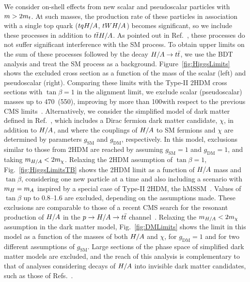 We consider on-shell effects from new scalar and pseudoscalar particles with $m > 2m_t$. At such masses, the production rate of these particles
in association with a single top quark ($tqH/A$, $tWH/A$) becomes significant,
so we include these processes in addition to $t\overline{t}H/A$.
As pointed out in Ref.~\cite{THEORY:Craig2016ygr}, these processes do not suffer significant interference with the SM \tttt process.
To obtain upper limits on the sum of these processes followed by the decay $H/A\to t\bar{t}$,
we use the BDT analysis and treat the SM \tttt process as a background.
Figure~\ref{fig:HiggsLimits} shows the excluded cross section as a function of the mass of the scalar (left) and pseudoscalar (right).
Comparing these limits with the Type-II 2HDM cross sections with $\tan\beta = 1$ in the alignment limit,
we exclude scalar (pseudoscalar) masses up to 470~(550)\GeV, improving by more than 100\GeV with respect to the previous CMS limits~\cite{CMS:mySUS2016}.
Alternatively, we consider the simplified model of dark matter defined in Ref.~\cite{CMS:DMsingletop},
which includes a Dirac fermion dark matter candidate, $\chi$, in addition to $H/A$, and where the couplings of $H/A$
to SM fermions and $\chi$ are determined by parameters $g_\mathrm{SM}$ and $g_\mathrm{DM}$, respectively.
In this model, exclusions similar to those from 2HDM are reached by assuming $g_\mathrm{SM} = 1$ and $g_\mathrm{DM} = 1$,
and taking  $m_{H/A} < 2 m_\chi$.
Relaxing the 2HDM assumption of $\tan\beta = 1$, Fig.~\ref{fig:HiggsLimitsTB} shows the 2HDM limit as a function of $H/A$ mass and $\tan\beta$,
considering one new particle at a time and also including a scenario with  $m_H = m_A$ inspired by
a special case of Type-II 2HDM, the hMSSM~\cite{THEORY:Djouadi2013uqa}.
Values of $\tan\beta$ up to 0.8--1.6 are excluded, depending on the assumptions made.
These exclusions are comparable to those of a recent CMS search for the resonant production of $H/A$ in the
$p\to H/A \to t\bar{t}$ channel~\cite{CMS:HIG17027}.
Relaxing the $m_{H/A} < 2 m_\chi$ assumption in the dark matter model, Fig.~\ref{fig:DMLimits} shows the
limit in this model as a function of the masses of both $H/A$ and $\chi$,
for $g_\mathrm{DM} = 1$ and for two different assumptions of $g_\mathrm{SM}$.
Large sections of the phase space of simplified dark matter models are excluded, and the reach of this analysis is complementary
to that of analyses
considering decays of $H/A$ into invisible dark matter candidates, such as those of Refs.~\cite{CMS:DMsingletop, ATLAS:Aaboud2017rzf}.

